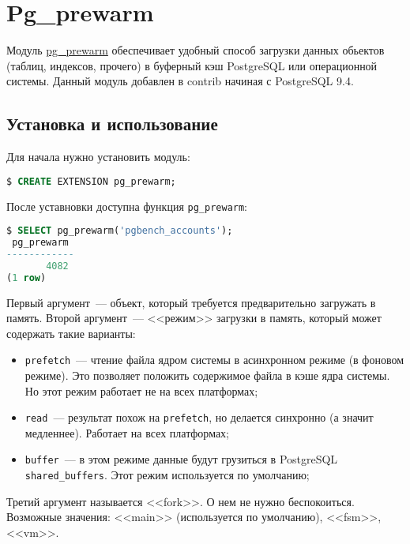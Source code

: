 \section{Pg\_prewarm}

Модуль \href{https://www.postgresql.org/docs/current/static/pgprewarm.html}{pg\_prewarm} обеспечивает удобный способ загрузки данных обьектов (таблиц, индексов, прочего) в буферный кэш PostgreSQL или операционной системы. Данный модуль добавлен в contrib начиная с PostgreSQL 9.4.


\subsection{Установка и использование}

Для начала нужно установить модуль:

\begin{lstlisting}[language=SQL,label=lst:pgprewarm1]
$ CREATE EXTENSION pg_prewarm;
\end{lstlisting}

После уставновки доступна функция \lstinline!pg_prewarm!:

\begin{lstlisting}[language=SQL,label=lst:pgprewarm2]
$ SELECT pg_prewarm('pgbench_accounts');
 pg_prewarm
------------
       4082
(1 row)
\end{lstlisting}

Первый аргумент~--- объект, который требуется предварительно загружать в память. Второй аргумент~--- <<режим>> загрузки в память, который может содержать такие варианты:

\begin{itemize}
  \item \lstinline!prefetch!~--- чтение файла ядром системы в асинхронном режиме (в фоновом режиме). Это позволяет положить содержимое файла в кэше ядра системы. Но этот режим работает не на всех платформах;
  \item \lstinline!read!~--- результат похож на \lstinline!prefetch!, но делается синхронно (а значит медленнее). Работает на всех платформах;
  \item \lstinline!buffer!~--- в этом режиме данные будут грузиться в PostgreSQL \lstinline!shared_buffers!. Этот режим используется по умолчанию;
\end{itemize}

Третий аргумент называется <<fork>>. О нем не нужно беспокоиться. Возможные значения: <<main>> (используется по умолчанию), <<fsm>>, <<vm>>.

